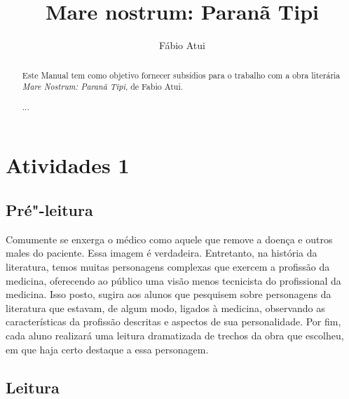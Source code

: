 \documentclass[12pt]{extarticle}
\begin{document}
\newcommand{\AutorLivro}{Fábio Atui}
\newcommand{\TituloLivro}{Mare nostrum: Paranã Tipi}
\newcommand{\Tema}{Ficção, mistério e fantasia}
\newcommand{\Genero}{Romance}
\newcommand{\issnppub}{---}
\newcommand{\issnepub}{---}
\newcommand{\colaborador}{\textbf{Bruno Gradella e Vicente Castro} é uma pessoa incrível e vai fazer um bom serviço.}


\title{\TituloLivro}
\author{\AutorLivro}
\def\authornotes{\colaborador}

\date{}
\maketitle

\begin{abstract}

Este Manual tem como objetivo fornecer subsídios para o trabalho com a
obra literária \emph{Mare Nostrum: Paranã Tipi}, de Fabio Atui.

...

\end{abstract}

\tableofcontents


\section{Atividades 1}

\subsection{Pré"-leitura}


Comumente se enxerga o médico como aquele que remove a
doença e outros males do paciente. Essa imagem é verdadeira. Entretanto,
na história da literatura, temos muitas personagens complexas que
exercem a profissão da medicina, oferecendo ao público uma visão menos
tecnicista do profissional da medicina. Isso posto, sugira aos alunos
que pesquisem sobre personagens da literatura que estavam, de algum
modo, ligados à medicina, observando as características da profissão
descritas e aspectos de sua personalidade. Por fim, cada aluno realizará
uma leitura dramatizada de trechos da obra que escolheu, em que haja
certo destaque a essa personagem.

\subsection{Leitura}
\end{document}
